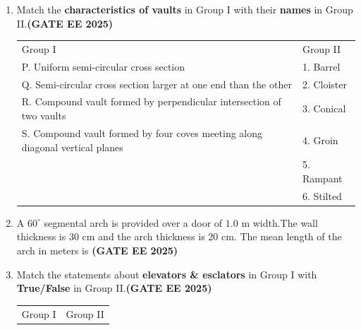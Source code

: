 \documentclass[journal,12pt,onecolumn]{IEEEtran}
\theoremstyle{remark}
\begin{document}
\begin{enumerate}
\item Match the \textbf{characteristics of vaults} in Group I with their \textbf{names} in Group II.\hfill \textbf{(GATE EE 2025)}
\newline
\begin{tabular}{p{}p{}}
Group I     &Group II  \\
P. Uniform semi-circular cross section     & 1. Barrel\\
Q. Semi-circular cross section larger at one end than the other & 2. Cloister\\
R. Compound vault formed by perpendicular intersection of two vaults & 3. Conical\\
S. Compound vault formed by four coves meeting along diagonal vertical planes & 4. Groin\\
  & 5. Rampant\\
  &6. Stilted\\
\end{tabular}
\begin{enumerate}
\end{enumerate}
\item  A $60^\circ$ segmental arch is provided over a door of $1.0$ m width.The wall thickness is $30$ cm and the arch thickness is $20$ cm. The mean length of the arch in meters is \hfill \textbf{(GATE EE 2025)}
\begin{enumerate}
\end{enumerate}
\item Match the statements about \textbf{elevators \& esclators} in Group I with \textbf{True/False} in Group II.\hfill \textbf{(GATE EE 2025)}
\newline
\begin{tabular}{p{}p{}}
Group I  &  Group II\\

\end{tabular}
\end{enumerate}
\end{document}
